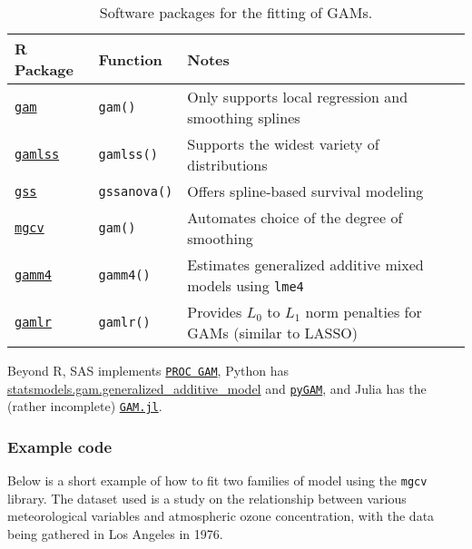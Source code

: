 \documentclass{report}
\begin{document}
\begin{table}[h!]
\centering
\begin{tabular}{||l l l||} 
 \hline
 \textbf{R Package} & \textbf{Function} & \textbf{Notes} \\ [0.5ex] 
  \hline\hline
  \href{https://cran.r-project.org/web/packages/gam/index.html}{\texttt{gam}} & \texttt{gam()} & Only supports local regression and smoothing splines \\ 
  \hline
  \href{https://cran.r-project.org/web/packages/gamlss/index.html}{\texttt{gamlss}} & \texttt{gamlss()} & Supports the widest variety of distributions \\
  \hline
  \href{https://cran.r-project.org/web/packages/gamlss/index.html}{\texttt{gss}} & \texttt{gssanova()} & Offers spline-based survival modeling \\
  \hline 
  \href{https://cran.r-project.org/web/packages/mgcv/index.html}{\texttt{mgcv}} & \texttt{gam()} & Automates choice of the degree of smoothing \\
  \hline 
  \href{https://cran.r-project.org/web/packages/gamm4/index.html}{\texttt{gamm4}} & \texttt{gamm4()} & Estimates generalized additive mixed models using \texttt{lme4} \\
  \hline 
  \href{https://cran.r-project.org/web/packages/gamlr/index.html}{\texttt{gamlr}} & \texttt{gamlr()} & Provides $L_0$ to $L_1$ norm penalties for GAMs (similar to LASSO) \\
  \hline
\end{tabular}
\caption{Software packages for the fitting of GAMs.}
\label{table:gam-software}
\end{table}

Beyond R, SAS implements \href{https://support.sas.com/documentation/cdl/en/statug/63033/HTML/default/viewer.htm#statug_gam_sect004.htm}{\texttt{PROC GAM}}, Python has \href{https://www.statsmodels.org/stable/gam.html}{statsmodels.gam.generalized\_additive\_model} and \href{https://pygam.readthedocs.io/en/latest/}{\texttt{pyGAM}}, and Julia has the (rather incomplete) \href{https://github.com/hendersontrent/GAM.jl?tab=readme-ov-file}{\texttt{GAM.jl}}.

\subsubsection{Example code}

Below is a short example of how to fit two families of model using the \texttt{mgcv} library. The dataset used is a study on the relationship between various meteorological variables and atmospheric ozone concentration, with the data being gathered in Los Angeles in 1976. 
\end{document}
